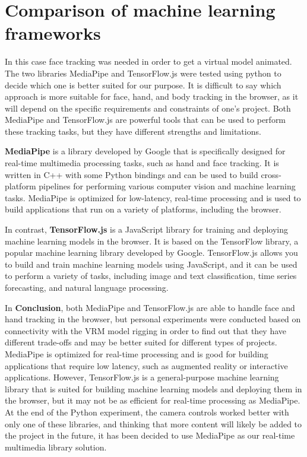 \section{Comparison of machine learning frameworks}
In this case face tracking was needed in order to get a virtual model animated. 
The two libraries MediaPipe and TensorFlow.js were tested using python to decide 
which one is better suited for our purpose. It is difficult to say which approach 
is more suitable for face, hand, and body tracking in the browser, as it will depend 
on the specific requirements and constraints of one's project. Both MediaPipe and 
TensorFlow.js are powerful tools that can be used to perform these tracking tasks, 
but they have different strengths and limitations.

\textbf{MediaPipe} is a library developed by Google that is specifically designed 
for real-time multimedia processing tasks, such as hand and face tracking. 
It is written in C++ with some Python bindings and can be used to build cross-platform 
pipelines for performing various computer vision and machine learning tasks. MediaPipe is 
optimized for low-latency, real-time processing and is used to build applications that run 
on a variety of platforms, including the browser. \cite{Mediapipe}

In contrast, \textbf{TensorFlow.js} is a JavaScript library for training and deploying machine 
learning models in the browser. It is based on the TensorFlow library, a popular machine 
learning library developed by Google. TensorFlow.js allows you to build and train machine 
learning models using JavaScript, and it can be used to perform a variety of tasks, including 
image and text classification, time series forecasting, and natural language processing. \cite{Tensorflow}

In \textbf{Conclusion}, both MediaPipe and TensorFlow.js are able to handle face and hand
tracking in the browser, but personal experiments were conducted based on connectivity with the VRM model rigging in order to find out 
that they have different trade-offs and may be better suited
for different types of projects. MediaPipe is optimized for real-time processing and is
good for building applications that require low latency, such as augmented reality or
interactive applications. However, TensorFlow.js is a general-purpose machine learning
library that is suited for building machine learning models and deploying them in the
browser, but it may not be as efficient for real-time processing as MediaPipe. 
At the end of the Python experiment, the camera controls worked better with only one of these libraries, 
and thinking that more content will likely be added to the project in the future, it has been decided 
to use MediaPipe as our real-time multimedia library solution.

